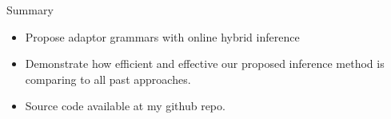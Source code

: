 \begin{frame}{Summary}
  \begin{itemize}
  \item Propose adaptor grammars with online hybrid inference\\
    \begin{scriptsize}
    \end{scriptsize}
  \item Demonstrate how efficient and effective our proposed inference
    method is comparing to all past approaches.
  \item Source code available at my github repo.
  \end{itemize}
\end{frame}
